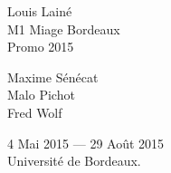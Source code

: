 \begin{titlepage}
\begin{center}
    \begin{minipage}{0.4\textwidth}
      \begin{flushleft} \large
        Louis Lainé\\
        M1 Miage Bordeaux \\
        Promo 2015 
      \end{flushleft}
    \end{minipage}
    \begin{minipage}{0.4\textwidth}
      \begin{flushright} \large
        Maxime Sénécat \\
        Malo Pichot \\
        Fred Wolf \\
      \end{flushright}
    \end{minipage}

    \vfill


    {\large 4 Mai 2015 — 29 Août 2015} \\
    {\large Université de Bordeaux. }

\end{center}



\end{titlepage}
